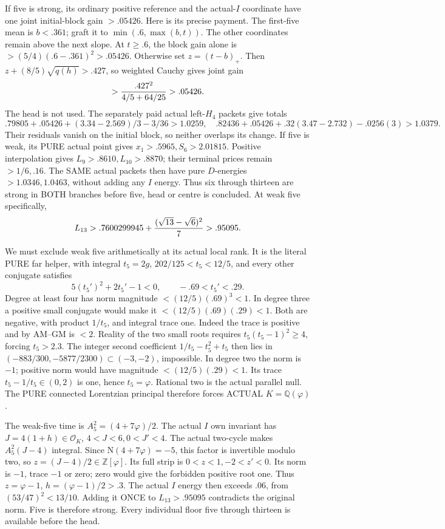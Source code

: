 \documentclass[11pt]{article}
\begin{document}
If five is strong, its ordinary positive
reference and the actual-\(I\) coordinate
have one joint initial-block gain \(>.05426\).
Here is its precise payment.
The first-five mean is \(b<.361\);
graft it to \(\min(.6,\max(b,t))\).
The other coordinates remain above the
next slope.
At \(t\ge.6\), the block gain alone
is \(>(5/4)(.6-.361)^2>.05426\).
Otherwise set \(z=(t-b)_+\).
Then \(z+(8/5)\sqrt{q(h)}>.427\),
so weighted Cauchy gives joint gain
\[
                      >{.427^2\over4/5+64/25}>.05426 .
\]
The head is not used.
The separately paid actual left-\(H_4\)
packets give totals
\[
 .79805+.05426+(3.34-2.569)/3-3/36>1.0259,
 \quad
 .82436+.05426+.32(3.47-2.732)-.0256(3)>1.0379 .
\]
Their residuals vanish on the initial
block, so neither overlaps its change.
If five is weak, its PURE actual point
gives \(x_1>.5965,S_6>2.01815\).
Positive interpolation gives
\(L_9>.8610,L_{10}>.8870\);
their terminal prices remain \(>1/6,.16\).
The SAME actual packets then have pure
\(D\)-energies \(>1.0346,1.0463\),
without adding any \(I\) energy.
Thus six through thirteen are strong
in BOTH branches before five, head or
centre is concluded.
At weak five specifically,
\[
                 L_{13}>
 .7600299945+{(\sqrt{13}-\sqrt6)^2\over7}>.95095 .
\]

We must exclude weak five arithmetically
at its actual local rank.
It is the literal PURE far helper,
with integral \(t_5=2g\),
\(202/125<t_5<12/5\), and every other
conjugate satisfies
\[
                       5(t_5')^2+2t_5'-1<0,\qquad-.69<t_5'<.29 .
\]
Degree at least four has norm magnitude
\(<(12/5)(.69)^3<1\).
In degree three a positive small conjugate
would make it \(<(12/5)(.69)(.29)<1\).
Both are negative, with product
\(1/t_5\), and integral trace one.
Indeed the trace is positive and by
AM--GM is \(<2\).
Reality of the two small roots requires
\(t_5(t_5-1)^2\ge4\), forcing \(t_5>2.3\).
The integer second coefficient
\(1/t_5-t_5^2+t_5\) then lies in
\((-883/300,-5877/2300)\subset(-3,-2)\),
impossible.
In degree two the norm is \(-1\);
positive norm would have magnitude
\(<(12/5)(.29)<1\).
Its trace \(t_5-1/t_5\in(0,2)\)
is one, hence \(t_5=\varphi\).
Rational two is the actual parallel null.
The PURE connected Lorentzian principal
therefore forces ACTUAL \(K=\mathbb Q(\varphi)\).

The weak-five time is
\(A_5^2=(4+7\varphi)/2\).
The actual \(I\) own invariant has
\(J=4(1+h)\in\mathcal O_K\),
\(4<J<6,0<J'<4\).
The actual two-cycle makes
\(A_5^2(J-4)\) integral.
Since \(\mathrm N(4+7\varphi)=-5\),
this factor is invertible modulo two,
so \(z=(J-4)/2\in\mathbb Z[\varphi]\).
Its full strip is
\(0<z<1,-2<z'<0\).
Its norm is \(-1\), trace \(-1\)
or zero; zero would give the forbidden
positive root one.
Thus \(z=\varphi-1\),
\(h=(\varphi-1)/2>.3\).
The actual \(I\) energy then exceeds
\(.06\), from \((53/47)^2<13/10\).
Adding it ONCE to \(L_{13}>.95095\)
contradicts the original norm.
Five is therefore strong.
Every individual floor five through
thirteen is available before the head.
\end{document}
